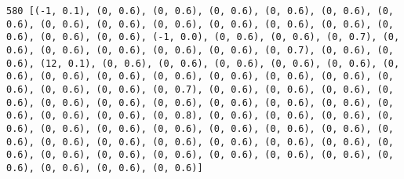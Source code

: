 \documentclass[11pt]{article}
\begin{document}
\begin{Verbatim}[commandchars=\\\{\}]
580 [(-1, 0.1), (0, 0.6), (0, 0.6), (0, 0.6), (0, 0.6), (0, 0.6), (0, 0.6), (0, 0.6), (0, 0.6), (0, 0.6), (0, 0.6), (0, 0.6), (0, 0.6), (0, 0.6), (0, 0.6), (0, 0.6), (-1, 0.0), (0, 0.6), (0, 0.6), (0, 0.7), (0, 0.6), (0, 0.6), (0, 0.6), (0, 0.6), (0, 0.6), (0, 0.7), (0, 0.6), (0, 0.6), (12, 0.1), (0, 0.6), (0, 0.6), (0, 0.6), (0, 0.6), (0, 0.6), (0, 0.6), (0, 0.6), (0, 0.6), (0, 0.6), (0, 0.6), (0, 0.6), (0, 0.6), (0, 0.6), (0, 0.6), (0, 0.6), (0, 0.7), (0, 0.6), (0, 0.6), (0, 0.6), (0, 0.6), (0, 0.6), (0, 0.6), (0, 0.6), (0, 0.6), (0, 0.6), (0, 0.6), (0, 0.6), (0, 0.6), (0, 0.6), (0, 0.8), (0, 0.6), (0, 0.6), (0, 0.6), (0, 0.6), (0, 0.6), (0, 0.6), (0, 0.6), (0, 0.6), (0, 0.6), (0, 0.6), (0, 0.6), (0, 0.6), (0, 0.6), (0, 0.6), (0, 0.6), (0, 0.6), (0, 0.6), (0, 0.6), (0, 0.6), (0, 0.6), (0, 0.6), (0, 0.6), (0, 0.6), (0, 0.6), (0, 0.6), (0, 0.6), (0, 0.6), (0, 0.6)]

\end{Verbatim}
\end{document}

